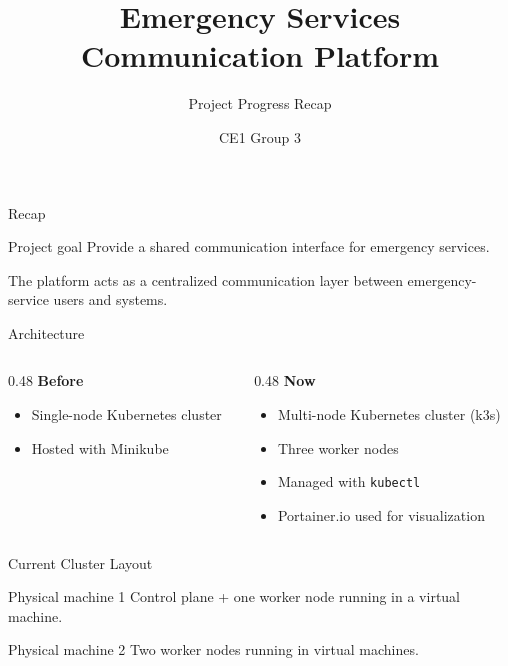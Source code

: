 \documentclass[aspectratio=169]{beamer}
\title{Emergency Services Communication Platform}
\subtitle{Project Progress Recap}
\author{CE1 Group 3}
\date{}
\begin{document}
\begin{frame}
    \titlepage
\end{frame}

\begin{frame}{Recap}
    \begin{block}{Project goal}
        Provide a shared communication interface for emergency services.
    \end{block}

    \vfill

    The platform acts as a centralized communication layer between emergency-service users and systems.
\end{frame}

\begin{frame}{Architecture}
    \begin{columns}[T]
        \begin{column}{0.48\textwidth}
            \textbf{Before}
            \begin{itemize}
                \item Single-node Kubernetes cluster
                \item Hosted with Minikube
            \end{itemize}
        \end{column}
        \begin{column}{0.48\textwidth}
            \textbf{Now}
            \begin{itemize}
                \item Multi-node Kubernetes cluster (k3s)
                \item Three worker nodes
                \item Managed with \texttt{kubectl}
                \item Portainer.io used for visualization
            \end{itemize}
        \end{column}
    \end{columns}
\end{frame}

\begin{frame}{Current Cluster Layout}
    \begin{block}{Physical machine 1}
        Control plane + one worker node running in a virtual machine.
    \end{block}

    \begin{block}{Physical machine 2}
        Two worker nodes running in virtual machines.
    \end{block}

\end{frame}
\end{document}
